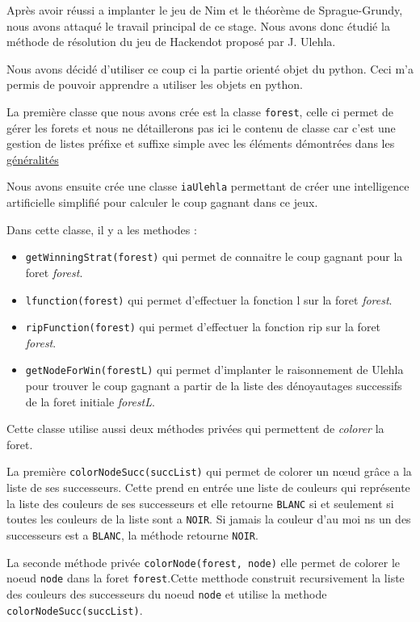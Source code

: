 Après avoir réussi a implanter le jeu de Nim et le théorème de Sprague-Grundy, nous avons attaqué le travail principal de ce stage. Nous avons donc étudié la méthode de résolution du jeu de Hackendot proposé par J. Ulehla.

Nous avons décidé d'utiliser ce coup ci la partie orienté objet du python. Ceci m'a permis de pouvoir apprendre a utiliser les objets en python.

La première classe que nous avons crée est la classe \texttt{forest}, celle ci permet de gérer les forets et nous ne détaillerons pas ici le contenu de classe car c'est une gestion de listes préfixe et suffixe simple avec les éléments démontrées dans les \hyperlink{GenArbres}{généralités}

Nous avons ensuite crée une classe \texttt{iaUlehla} permettant de créer une intelligence artificielle simplifié pour calculer le coup gagnant dans ce jeux.

Dans cette classe, il y a les methodes :
\begin{itemize}
  \item \texttt{getWinningStrat(forest)} qui permet de connaitre le coup gagnant pour la foret \textit{forest}.
  \item \texttt{lfunction(forest)} qui permet d'effectuer la fonction l sur la foret \textit{forest}.
  \item \texttt{ripFunction(forest)} qui permet d'effectuer la fonction rip sur la foret \textit{forest}.
  \item \texttt{getNodeForWin(forestL)} qui permet d'implanter le raisonnement de Ulehla pour trouver le coup gagnant a partir de la liste des dénoyautages successifs de la foret initiale \textit{forestL}.
\end{itemize}

Cette classe utilise aussi deux méthodes privées qui permettent de \textit{colorer} la foret.

La première \texttt{colorNodeSucc(succList)} qui permet de colorer un nœud grâce a la liste de ses successeurs. Cette prend en entrée une liste de couleurs qui représente la liste des couleurs de ses successeurs et elle retourne \texttt{BLANC} si et seulement si toutes les couleurs de la liste sont a \texttt{NOIR}. Si jamais la couleur d'au moi ns un des successeurs est a \texttt{BLANC}, la méthode retourne \texttt{NOIR}.

La seconde méthode privée \texttt{colorNode(forest, node)} elle permet de colorer le noeud \texttt{node} dans la foret \texttt{forest}.Cette metthode construit recursivement la liste des couleurs des successeurs du noeud \texttt{node} et utilise la methode \texttt{colorNodeSucc(succList)}.

